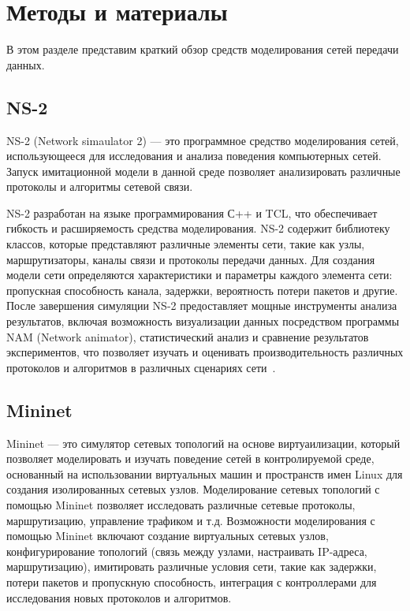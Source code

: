 \chapter{Методы и материалы}

В этом разделе представим краткий обзор средств моделирования сетей
передачи данных.

\section{NS-2}
NS-2 (Network simaulator 2) — это программное средство моделирования
сетей, использующееся для исследования и анализа поведения
компьютерных сетей.  Запуск имитационной модели в данной среде
позволяет анализировать различные протоколы и алгоритмы сетевой связи.

NS-2 разработан на языке программирования С++ и TCL, что обеспечивает
гибкость и расширяемость средства моделирования.  NS-2 содержит
библиотеку классов, которые представляют различные элементы сети,
такие как узлы, маршрутизаторы, каналы связи и протоколы передачи
данных. Для создания модели сети определяются характеристики и
параметры каждого элемента сети: пропускная способность канала,
задержки, вероятность потери пакетов и другие. После завершения
симуляции NS-2 предоставляет мощные инструменты анализа результатов,
включая возможность визуализации данных посредством программы NAM
(Network animator), статистический анализ и сравнение результатов
экспериментов, что позволяет изучать и оценивать производительность
различных протоколов и алгоритмов в различных сценариях
сети~\cite{NS1,NS2}.

\section{Mininet}

Mininet — это симулятор сетевых топологий на основе виртуаилизации,
который позволяет моделировать и изучать поведение сетей в
контролируемой среде, основанный на использовании виртуальных машин и
пространств имен Linux для создания изолированных сетевых
узлов. Моделирование сетевых топологий с помощью Mininet позволяет
исследовать различные сетевые протоколы, маршрутизацию, управление
трафиком и т.д. Возможности моделирования с помощью Mininet включают
создание виртуальных сетевых узлов, конфигурирование топологий (связь
между узлами, настраивать IP-адреса, маршрутизацию), имитировать
различные условия сети, такие как задержки, потери пакетов и
пропускную способность, интеграция с контроллерами для исследования
новых протоколов и алгоритмов.

